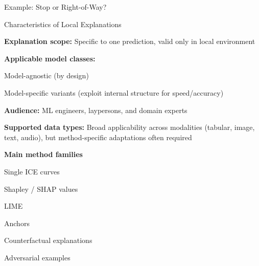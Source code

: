 \documentclass[10pt,compress,t,notes=noshow, xcolor=table]{beamer}
\begin{document}
\begin{framev}[align=top]{Example: Stop or Right-of-Way?}
%
\end{framev}


\begin{framei}[align=top]{Characteristics of Local Explanations}
\item<1-> \textbf{Explanation scope:} Specific to one prediction, valid only in local environment
\item<2-> \textbf{Applicable model classes:}
\begin{itemizeS}
\item Model-agnostic (by design)
\item Model-specific variants (exploit internal structure for speed/accuracy)
\end{itemizeS}
\item<3-> \textbf{Audience:} ML engineers, laypersons, and domain experts
\item<4-> \textbf{Supported data types:} Broad applicability across modalities (tabular, image, text, audio), but method-specific adaptations often required
\item<5-> \textbf{Main method families}
\begin{itemizeS}
\item Single ICE curves
\item Shapley / SHAP values
\item LIME 
\item Anchors
\item Counterfactual explanations
\item Adversarial examples
\end{itemizeS}
\end{framei}
\end{document}
